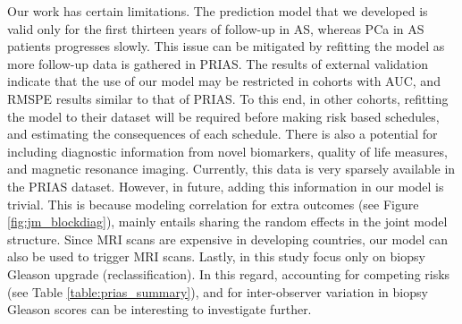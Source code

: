 Our work has certain limitations. The prediction model that we developed is valid only for the first thirteen years of follow-up in AS, whereas PCa in AS patients progresses slowly. This issue can be mitigated by refitting the model as more follow-up data is gathered in PRIAS. The results of external validation indicate that the use of our model may be restricted in cohorts with AUC, and RMSPE results similar to that of PRIAS. To this end, in other cohorts, refitting the model to their dataset will be required before making risk based schedules, and estimating the consequences of each schedule. There is also a potential for including diagnostic information from novel biomarkers, quality of life measures, and magnetic resonance imaging. Currently, this data is very sparsely available in the PRIAS dataset. However, in future, adding this information in our model is trivial. This is because modeling correlation for extra outcomes  (see Figure \ref{fig:jm_blockdiag}), mainly entails sharing the random effects in the joint model structure. Since MRI scans are expensive in developing countries, our model can also be used to trigger MRI scans. Lastly, in this study focus only on biopsy Gleason upgrade (reclassification). In this regard, accounting for competing risks (see Table \ref{table:prias_summary}), and for inter-observer variation \citep{coley2017prediction} in biopsy Gleason scores can be interesting to investigate further.